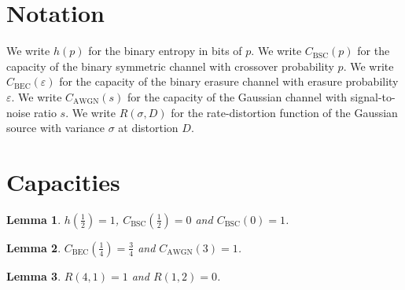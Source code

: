 \documentclass{article}
\newtheorem{lemma}{Lemma}
\begin{document}
\section{Notation}

We write $h(p)$ for the binary entropy in bits of $p$.
We write $C_{\mathrm{BSC}}(p)$ for the capacity of the binary symmetric channel with crossover probability $p$.
We write $C_{\mathrm{BEC}}(\varepsilon)$ for the capacity of the binary erasure channel with erasure probability $\varepsilon$.
We write $C_{\mathrm{AWGN}}(s)$ for the capacity of the Gaussian channel with signal-to-noise ratio $s$.
We write $R(\sigma,D)$ for the rate-distortion function of the Gaussian source with variance $\sigma$ at distortion $D$.

\section{Capacities}

\begin{lemma}\label{bsc}
$h(\frac12)=1$, $C_{\mathrm{BSC}}(\frac12)=0$ and $C_{\mathrm{BSC}}(0)=1$.
\end{lemma}

\begin{lemma}\label{bec}
$C_{\mathrm{BEC}}(\frac14)=\frac34$ and $C_{\mathrm{AWGN}}(3)=1$.
\end{lemma}

\begin{lemma}\label{rd}
$R(4,1)=1$ and $R(1,2)=0$.
\end{lemma}
\end{document}
